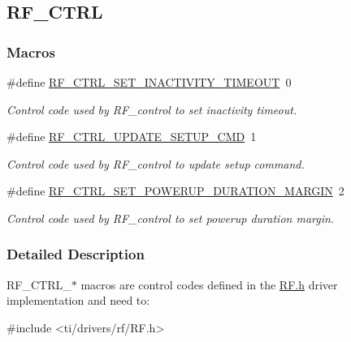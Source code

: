\subsection{R\+F\+\_\+\+C\+T\+R\+L}
\label{group___r_f___c_t_r_l}
\subsubsection*{Macros}
\begin{DoxyCompactItemize}
\item 
\#define \hyperlink{group___r_f___c_t_r_l_ga24096530a8da4bde84275bc9c76b2cee}{R\+F\+\_\+\+C\+T\+R\+L\+\_\+\+S\+E\+T\+\_\+\+I\+N\+A\+C\+T\+I\+V\+I\+T\+Y\+\_\+\+T\+I\+M\+E\+O\+U\+T}~0
\begin{DoxyCompactList}\small\item\em Control code used by R\+F\+\_\+control to set inactivity timeout. \end{DoxyCompactList}\item 
\#define \hyperlink{group___r_f___c_t_r_l_ga74d367afdca187785b17c59b31d1e89a}{R\+F\+\_\+\+C\+T\+R\+L\+\_\+\+U\+P\+D\+A\+T\+E\+\_\+\+S\+E\+T\+U\+P\+\_\+\+C\+M\+D}~1
\begin{DoxyCompactList}\small\item\em Control code used by R\+F\+\_\+control to update setup command. \end{DoxyCompactList}\item 
\#define \hyperlink{group___r_f___c_t_r_l_ga32bd63d8617c2fde41bbc30d1e8f0db5}{R\+F\+\_\+\+C\+T\+R\+L\+\_\+\+S\+E\+T\+\_\+\+P\+O\+W\+E\+R\+U\+P\+\_\+\+D\+U\+R\+A\+T\+I\+O\+N\+\_\+\+M\+A\+R\+G\+I\+N}~2
\begin{DoxyCompactList}\small\item\em Control code used by R\+F\+\_\+control to set powerup duration margin. \end{DoxyCompactList}\end{DoxyCompactItemize}


\subsubsection{Detailed Description}
R\+F\+\_\+\+C\+T\+R\+L\+\_\+$\ast$ macros are control codes defined in the \hyperlink{_r_f_8h}{R\+F.\+h} driver implementation and need to\+: 
\begin{DoxyCode}
\textcolor{preprocessor}{#include <ti/drivers/rf/RF.h>}
\end{DoxyCode}
 

